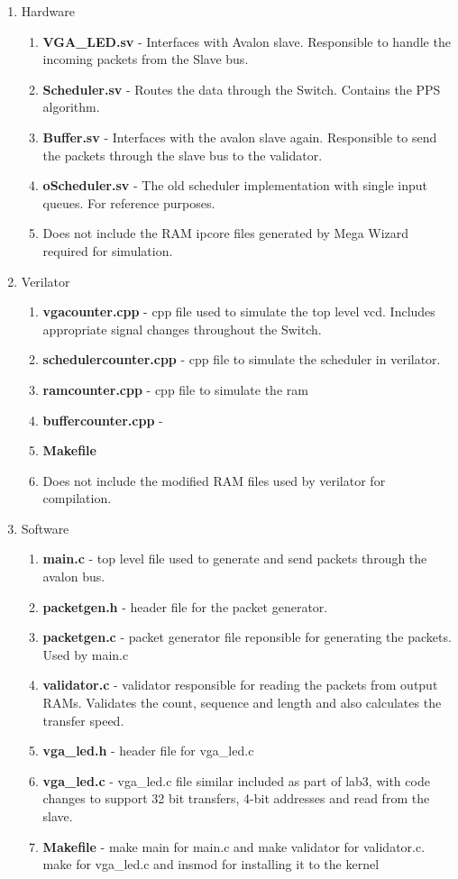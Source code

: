 \documentclass[twoside,12pt,fleqn]{book} %
\begin{document}
\begin{enumerate}
    \item Hardware
    \begin{enumerate}
        \item \textbf{VGA\_LED.sv} - Interfaces with Avalon slave. Responsible to handle the incoming packets from the Slave bus.
        \item \textbf{Scheduler.sv} - Routes the data through the Switch. Contains the PPS algorithm.
        \item \textbf{Buffer.sv} - Interfaces with the avalon slave again. Responsible to send the packets through the slave bus to the validator.
        \item \textbf{oScheduler.sv} - The old scheduler implementation with single input queues. For reference purposes.
        \item Does not include the RAM ipcore files generated by Mega Wizard required for simulation.
    \end{enumerate}
    \item Verilator
    \begin{enumerate}
        \item \textbf{vgacounter.cpp} - cpp file used to simulate the top level vcd. Includes appropriate signal changes throughout the Switch.
        \item \textbf{schedulercounter.cpp} - cpp file to simulate the scheduler in verilator.
        \item \textbf{ramcounter.cpp} - cpp file to simulate the ram
        \item \textbf{buffercounter.cpp} - 
        \item \textbf{Makefile}
        \item Does not include the modified RAM files used by verilator for compilation.
    \end{enumerate}
    \item Software
    \begin{enumerate}
        \item \textbf{main.c} - top level file used to generate and send packets through the avalon bus.
        \item \textbf{packetgen.h} - header file for the packet generator.
        \item \textbf{packetgen.c} - packet generator file reponsible for generating the packets. Used by main.c
        \item \textbf{validator.c} - validator responsible for reading the packets from output RAMs. Validates the count, sequence and length and also calculates the transfer speed.
        \item \textbf{vga\_led.h} - header file for vga\_led.c
        \item \textbf{vga\_led.c} - vga\_led.c file similar included as part of lab3, with code changes to support 32 bit transfers, 4-bit addresses and read from the slave.
        \item \textbf{Makefile} - make main for main.c and make validator for validator.c. make for vga\_led.c and insmod for installing it to the kernel
    \end{enumerate}
\end{enumerate}
\newpage
\end{document}
